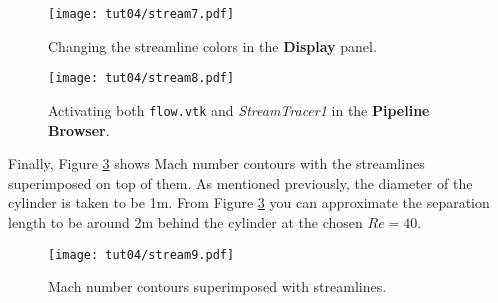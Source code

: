 \begin{figure}[ht]
    \centering
    \texttt{[image: tut04/stream7.pdf]}
    \caption{Changing the streamline colors in the \textbf{Display} panel.}
    \label{fig4:stream7_4}
\end{figure}
\begin{figure}[ht]
    \centering
    \texttt{[image: tut04/stream8.pdf]}
    \caption{Activating both \texttt{flow.vtk} and \textit{StreamTracer1} in the \textbf{Pipeline Browser}.}
    \label{fig4:stream8_4}
\end{figure}
Finally, Figure \ref{fig4:stream9_4} shows Mach number contours with the streamlines superimposed on top of them. As mentioned previously, the diameter of the cylinder is taken to be 1m. From Figure \ref{fig4:stream9_4} you can approximate the separation length to be around 2m behind the cylinder at the chosen $Re=40$.
\begin{figure}[H]
    \centering
    \texttt{[image: tut04/stream9.pdf]}
    \caption{Mach number contours superimposed with streamlines.}
    \label{fig4:stream9_4}
\end{figure}

